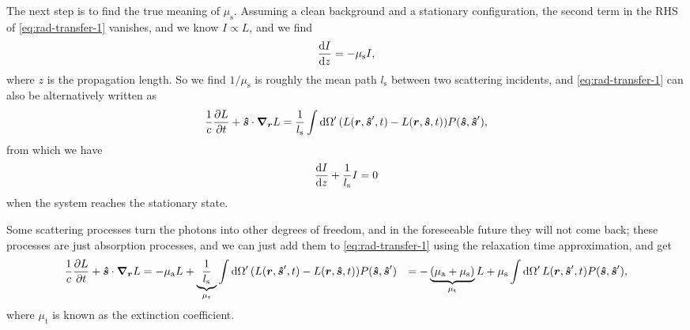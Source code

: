 \documentclass[hyperref, a4paper]{article}
\def\\{}%
\begin{document}
The next step is to find the true meaning of $\mu_{\text{s}}$. 
Assuming a clean background and a stationary configuration, 
the second term in the RHS of \eqref{eq:rad-transfer-1} vanishes, 
and we know $I \propto L$, 
and we find 
\[
    \dv{I}{z} = - \mu_{\text{s}} I, 
\]
where $z$ is the propagation length. 
So we find $1 / \mu_{\text{s}}$ is roughly 
the mean path $l_{\text{s}}$ between two scattering incidents, 
and \eqref{eq:rad-transfer-1} can also be alternatively written as 
\begin{equation}
    \frac{1}{c} \pdv{L}{t} + \vu*{s} \cdot \grad_{\vb*{r}} L = 
    \frac{1}{l_{\text{s}}} \int \dd{\Omega'} 
    (L(\vb*{r}, \vu*{s}', t) - L(\vb*{r}, \vu*{s}, t)) P(\vu*{s}, \vu*{s}'),
    \label{eq:rad-transfer-2}
\end{equation}
from which we have 
\begin{equation}
    \dv{I}{z} + \frac{1}{l_{\text{s}}} I = 0 
\end{equation}
when the system reaches the stationary state. 

Some scattering processes turn the photons into other degrees of freedom, 
and in the foreseeable future they will not come back; 
these processes are just absorption processes, 
and we can just add them to \eqref{eq:rad-transfer-1} 
using the relaxation time approximation, and get 
\begin{equation}
    \begin{aligned}
        \frac{1}{c} \pdv{L}{t} + \vu*{s} \cdot \grad_{\vb*{r}} L &= 
        - \mu_{\text{a}} L +
        \underbrace{\frac{1}{l_{\text{s}}}}_{\mu_{\text{s}}} \int \dd{\Omega'} 
        (L(\vb*{r}, \vu*{s}', t) - L(\vb*{r}, \vu*{s}, t)) P(\vu*{s}, \vu*{s}') \\
        &= - \underbrace{(\mu_{\text{a}} + \mu_{\text{s}})}_{\mu_{\text{t}}} L 
        + \mu_{\text{s}} \int \dd{\Omega'} 
        L(\vb*{r}, \vu*{s}', t) P(\vu*{s}, \vu*{s}') ,
    \end{aligned}
    \label{eq:rte-final}
\end{equation}
where $\mu_{\text{t}}$ is known as the extinction coefficient. 
\end{document}
